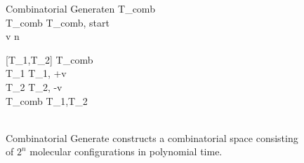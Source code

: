 


\begin{figure}[htbp]
\begin{center}

	\begin{pseudocode}{Combinatorial Generate}{n}
		T_{comb} \GETS \emptyset \\
		T_{comb} \GETS {}T_{comb}, start\text{)} \\ 
	
		\FOR v   n \DO
			\BEGIN
			
			[T_1,T_2] \GETS {} T_{comb}\text{)}\\
			T_1 \GETS {}T_1, +v \text{)}\\
			T_2 \GETS {}T_2, -v \text{)}\\
			T_{comb} \GETS {}T_1,T_2\text{)}\\
		\END
		\\
	\end{pseudocode}

\caption{{\sc Combinatorial Generate} constructs a combinatorial space consisting of $2^n$ molecular configurations in polynomial time.}
\label{combinatorialGenerate}
\end{center}
\end{figure}
